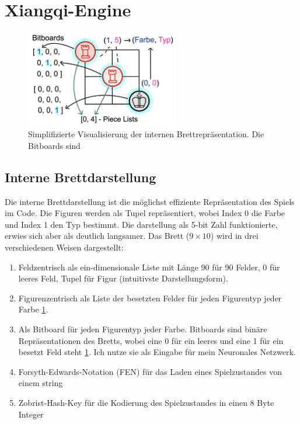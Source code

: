 \documentclass[
  manuscript=article,  %
  layout=publish,  %
  year=2023,
  volume=1,
]{extra/joas}
\begin{document}
\section{Xiangqi-Engine}
\begin{figure}
    \centering
    \includegraphics[width={0.6\textwidth}]{imgs/Board repr.png}
    \caption{Simplifizierte Visualisierung der internen Brettrepräsentation. Die Bitboards sind }
    \label{fig:repr}
\end{figure}
\subsection{Interne Brettdarstellung}\label{subsec:interneDarstellung}
Die interne Brettdarstellung ist die möglichst effiziente Repräsentation des Spiels im Code. Die Figuren werden als Tupel repräsentiert, wobei Index 0 die Farbe und Index 1 den Typ bestimmt. Die darstellung als 5-bit Zahl funktionierte, erwies sich aber als deutlich langsamer. Das Brett ($9\times10$) wird in drei verschiedenen Weisen dargestellt:

\begin{enumerate}
\item Feldzentrisch als ein-dimensionale Liste mit Länge 90 für 90 Felder, 0 für leeres Feld, Tupel für Figur (intuitivste Darstellungsform).
\item Figurenzentrisch als Liste der besetzten Felder für jeden Figurentyp jeder Farbe \ref{fig:repr}. 
\item Als Bitboard für jeden Figurentyp jeder Farbe. Bitboards sind binäre Repräsentationen des Bretts, wobei eine 0 für ein leeres und eine 1 für ein besetzt Feld steht \ref{fig:repr}. Ich nutze sie als Eingabe für mein Neuronales Netzwerk.
\item Forsyth-Edwards-Notation (FEN) für das Laden eines Spielzustandes von einem string
\item Zobrist-Hash-Key für die Kodierung des Spielzustandes in einen 8 Byte Integer
\end{enumerate}
\end{document}
